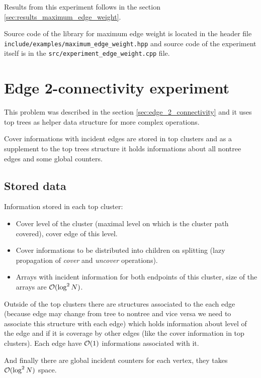 Results from this experiment follows in the section
\ref{sec:results_maximum_edge_weight}.

Source code of the library for maximum edge weight is located in the header file
\texttt{include/examples/maximum\_edge\_weight.hpp} and source code of the
experiment itself is in the \texttt{src/experiment\_edge\_weight.cpp} file.


\vfill\eject %

\section{Edge 2-connectivity experiment}
\label{sec:experiment_edge_2_connectivity}

This problem was described in the section \ref{sec:edge_2_connectivity} and it
uses top trees as helper data structure for more complex operations.

Cover informations with incident edges are stored in top clusters and as a
supplement to the top trees structure it holds informations about all nontree
edges and some global counters.

\subsection{Stored data}

Information stored in each top cluster:
\begin{itemize}
\item Cover level of the cluster (maximal level on which is the cluster path
covered), cover edge of this level.

\item Cover informations to be distributed into children on splitting (lazy
propagation of {\it cover} and {\it uncover} operations).

\item Arrays with incident information for both endpoints of this cluster, size
of the arrays are ${\cal O}(\log^2 N)$.
\end{itemize}

Outside of the top clusters there are structures associated to the each edge
(because edge may change from tree to nontree and vice versa we need to associate
this structure with each edge) which holds information about level of the edge
and if it is coverage by other edges (like the cover information in top
clusters). Each edge have ${\cal O}(1)$ informations associated with it.

And finally there are global incident counters for each vertex, they takes
${\cal O}(\log^2 N)$ space.

